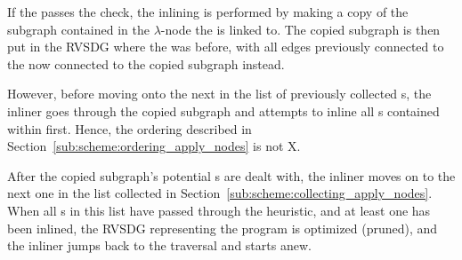 If the \applyNode passes the check, the inlining is performed by making a copy
of the subgraph contained in the $\lambda$-node the \applyNode is linked to. The
copied subgraph is then put in the RVSDG where the \applyNode was before, with
all edges previously connected to the \applyNode now connected to the copied
subgraph instead.

However, before moving onto the next \applyNode in the list of previously
collected \applyNode s, the inliner goes through the copied subgraph and
attempts to inline all \applyNode s contained within first. Hence, the ordering
described in Section~\ref{sub:scheme:ordering_apply_nodes} is not X.

After the copied subgraph's potential \applyNode s are dealt with, the inliner
moves on to the next one in the list collected in
Section~\ref{sub:scheme:collecting_apply_nodes}. When all \applyNode s in this
list have passed through the heuristic, and at least one \applyNode has been
inlined, the RVSDG representing the program is optimized (pruned), and the
inliner jumps back to the traversal and starts anew.
